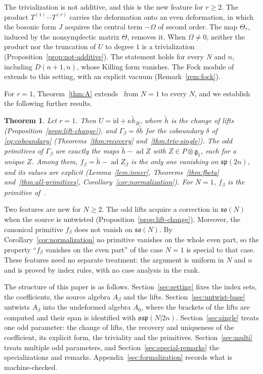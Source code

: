 \documentclass[11pt]{article}
\numberwithin{equation}{section}
\newtheorem{mainthm}{Theorem}
\theoremstyle{definition}
\theoremstyle{remark}
\newcommand{\osp}{\mathfrak{osp}}
\newcommand{\ad}{\operatorname{ad}}
\begin{document}
The trivialization is not additive, and this is the new feature for $r\geq2$. The product
$T^{(1)}\cdots T^{(r)}$ carries the deformation onto an even deformation, in which the bosonic
form $J$ acquires the central term $-\Omega$ of second order. The map $\Theta_*$, induced by the nonsymplectic matrix $\Theta$,
removes it. When $\Omega\neq0$, neither the product nor the truncation of $U$ to
degree $1$ is a trivialization (Proposition~\ref{prop:not-additive}). The statement holds for every
$N$ and $n$, including $D(n+1,n)$, whose Killing form vanishes. The Fock module of~\cite{Aoi26} extends to this setting, with an explicit vacuum (Remark~\ref{rem:fock}).

For $r=1$, Theorem~\ref{thm:A} extends~\cite{Aoi26} from $N=1$ to every $N$, and we establish
the following further results.

\begin{mainthm}\label{thm:B}
Let $r=1$. Then $U=\mathrm{id}+\kappa\tilde h_R$, where $\tilde h$ is the change of lifts
(Proposition~\ref{prop:lift-change}), and $\Gamma_\beta=\delta\tilde h$ for the coboundary
$\delta$ of \eqref{eq:coboundary}
(Theorems~\ref{thm:recovery} and~\ref{thm:triv-single}). The odd primitives of $\Gamma_\beta$
are exactly the maps $\tilde h-\ad Z$ with $Z\in P\otimes\mathfrak g_{\bar1}$, each for a unique
$Z$. Among them, $f_\beta=\tilde h-\ad Z_\beta$ is the only one vanishing on
$\mathfrak{sp}(2n)$, and its values are explicit (Lemma~\ref{lem:inner},
Theorems~\ref{thm:fbeta} and~\ref{thm:all-primitives}, Corollary~\ref{cor:normalization}).
For $N=1$, $f_\beta$ is the primitive of~\cite[Theorem~4.1]{Aoi26}.
\end{mainthm}

Two features are new for $N\geq2$. The odd lifts acquire a correction in
$\mathfrak{so}(N)$ when the source is untwisted (Proposition~\ref{prop:lift-change}).
Moreover, the canonical primitive $f_\beta$ does not vanish on $\mathfrak{so}(N)$. By
Corollary~\ref{cor:normalization} no primitive vanishes on the whole even part, so
the property ``$f_\beta$ vanishes on the even part'' of the case $N=1$ is special to
that case. These features need no separate treatment: the argument is uniform in $N$ and $n$ and is proved by index rules, with no case
analysis in the rank.

The structure of this paper is as follows. Section~\ref{sec:setting} fixes the index sets, the coefficients, the source algebra $A_\beta$ and the lifts.
Section~\ref{sec:untwist-base} untwists $A_\beta$ into the undeformed algebra $A_0$, where the
brackets of the lifts are computed and their span is identified with $\osp(N|2n)$. Section~\ref{sec:single} treats one odd
parameter: the change of lifts, the recovery and uniqueness of the coefficient, its explicit
form, the triviality and the primitives. Section~\ref{sec:multi} treats multiple odd
parameters, and Section~\ref{sec:special-remarks} the specializations and remarks.
Appendix~\ref{sec:formalization} records what is machine-checked.
\end{document}
